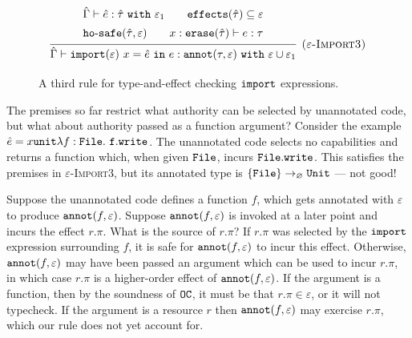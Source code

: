 \begin{figure}[h]

\[
\begin{array}{c}

\infer[\textsc{($\varepsilon$-Import3)}]
	{ \hat \Gamma \vdash \kwa{import}(\varepsilon)~x = \hat e~\kw{in} e: \kwa{annot}(\tau, \varepsilon)~\kw{with} \varepsilon \cup \varepsilon_1 }
{{\def\arraystretch{1.4}
  \begin{array}{c}
\hat \Gamma \vdash \hat e: \hat \tau~\kw{with} \varepsilon_1
~~~~~~
\kwa{effects}(\hat \tau) \subseteq \varepsilon \\
\hosafe{\hat \tau}{\varepsilon} ~~~~~~ x: \kwa{erase}(\hat \tau) \vdash e: \tau
  \end{array}}} 
 
\end{array}
\]

\vspace{-7pt}
\caption{A third rule for type-and-effect checking $\mathtt{import}$ expressions.}
\label{fig:import_rule3}
\end{figure}

The premises so far restrict what authority can be selected by unannotated code, but what about authority passed as a function argument? Consider the example $\hat e = {x}{\mathtt{unit}}{\lambda f: { \mathtt{File} }.~\mathtt{f.write}}$. The unannotated code selects no capabilities and returns a function which, when given $\mathtt{File}$, incurs $\mathtt{File.write}$. This satisfies the premises in \textsc{$\varepsilon$-Import3}, but its annotated type is $\{ \mathtt{File} \} \rightarrow_{\varnothing} \mathtt{Unit}$ --- not good!

Suppose the unannotated code defines a function $f$, which gets annotated with $\varepsilon$ to produce $\mathtt{annot}(f, \varepsilon)$. Suppose $\mathtt{annot}(f, \varepsilon)$ is invoked at a later point and incurs the effect $r.\pi$. What is the source of $r.\pi$? If $r.\pi$ was selected by the $\mathtt{import}$ expression surrounding $f$, it is safe for $\mathtt{annot}(f, \varepsilon)$ to incur this effect. Otherwise, $\mathtt{annot}(f, \varepsilon)$ may have been passed an argument which can be used to incur $r.\pi$, in which case $r.\pi$ is a higher-order effect of $\mathtt{annot}(f, \varepsilon)$. If the argument is a function, then by the soundness of $\mathtt{OC}$, it must be that $r.\pi \in \varepsilon$, or it will not typecheck. If the argument is a resource $r$ then $\mathtt{annot}(f, \varepsilon)$ may exercise $r.\pi$, which our rule does not yet account for.



